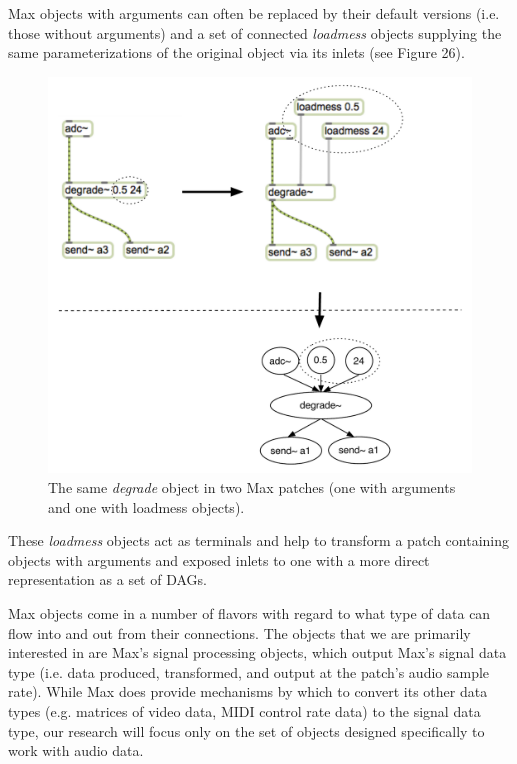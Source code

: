 \documentclass[12pt]{report} 	%
\numberwithin{figure}{chapter}
\numberwithin{table}{chapter}
\numberwithin{equation}{chapter}
\begin{document}
\begin{flushleft}
Max objects with arguments can often be replaced by their default versions (i.e. those without arguments) and a set of connected \textit{loadmess} objects supplying the same parameterizations of the original object via its inlets (see Figure 26). 
\begin{figure}[h!]
\begin{center}
\includegraphics[scale=0.7]{MaxDAGsLoadmess}
\caption[Using loadmess objects to provide parameters to Max]{The same \textit{degrade\texttildelow{}} object in two Max patches (one with arguments and one with loadmess objects).}
\end{center}
\end{figure}
These \textit{loadmess} objects act as terminals and help to transform a patch containing objects with arguments and exposed inlets to one with a more direct representation as a set of DAGs.

Max objects come in a number of flavors with regard to what type of data can flow into and out from their connections. The objects that we are primarily interested in are Max's signal processing objects, which output Max's signal data type (i.e. data produced, transformed, and output at the patch's audio sample rate). While Max does provide mechanisms by which to convert its other data types (e.g. matrices of video data, MIDI control rate data) to the signal data type, our research will focus only on the set of objects designed specifically to work with audio data. 


\end{flushleft}
\end{document}

